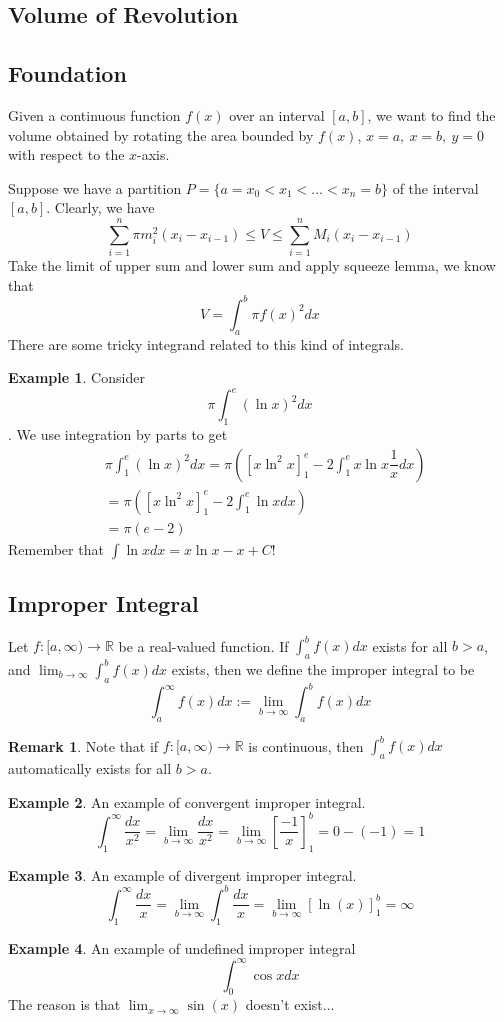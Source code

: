 \documentclass{article}
\theoremstyle{definition}
\theoremstyle{definition}
\theoremstyle{definition}
\theoremstyle{definition}
\theoremstyle{definition}
\newtheorem{remark}{Remark}
\theoremstyle{definition}
\newtheorem{example}{Example}
\theoremstyle{definition}
\theoremstyle{definition}
\theoremstyle{definition}
\newcommand{\RR}{\mathbb{R}}
\begin{document}
\subsection{Volume of Revolution}
\subsection{Foundation}
Given a continuous function $f(x)$ over an interval $[a,b]$,
we want to find the volume obtained by rotating the area bounded by $f(x)$, $x=a,\ x=b,\ y=0$ with respect to the $x$-axis.

Suppose we have a partition $P=\{a=x_0<x_1<\ldots<x_n=b\}$ of the interval $[a,b]$.
Clearly, we have 
\[
\sum_{i=1}^n\pi m_i^2(x_{i}-x_{i-1})\le V\le \sum_{i=1}^n M_i(x_{i}-x_{i-1})   
\]
Take the limit of upper sum and lower sum and apply squeeze lemma, we know that
\[
V=\int_a^b\pi f(x)^2dx    
\]
There are some tricky integrand related to this kind of integrals. 
\begin{example}
    Consider $$\pi\int_1^e(\ln x)^2dx$$. We use integration by parts to get
    \begin{align*}
        &\pi\int_1^e(\ln x)^2dx=\pi([x\ln^2 x]_1^e-2\int_1^e x\ln x\dfrac{1}{x}dx)\\
        &=\pi([x\ln^2 x]_1^e-2\int_1^e \ln xdx)\\
        &=\pi(e-2)
    \end{align*}
    Remember that $\int\ln xdx=x\ln x-x+C$!
\end{example}

\subsection{Improper Integral}
Let $f:[a,\infty)\to\RR$ be a real-valued function. If $\int_a^b f(x)dx$ exists for all $b>a$, and $\lim_{b\to\infty}\int_a^b f(x)dx$ exists,
then we define the improper integral to be
$$\int_a^\infty f(x)dx:=\lim_{b\to\infty}\int_a^b f(x)dx$$
\begin{remark}
    Note that if $f:[a,\infty)\to\RR$ is continuous, then $\int_a^b f(x)dx$ automatically exists for all $b>a$.
\end{remark}
\begin{example}
    An example of convergent improper integral.
    \[
    \int_1^\infty\dfrac{dx}{x^2}=\lim_{b\to\infty}\dfrac{dx}{x^2}=\lim_{b\to\infty}\left[\dfrac{-1}{x}\right]_1^b=0-(-1)=1
    \]
\end{example}
\begin{example}
    An example of divergent improper integral.
    \[
    \int_1^\infty\dfrac{dx}{x}=\lim_{b\to\infty}\int_1^b\dfrac{dx}{x}=\lim_{b\to\infty}[\ln(x)]_1^b=\infty    
    \]
\end{example}
\begin{example}
    An example of undefined improper integral
    \[
    \int_0^\infty\cos xdx    
    \]
    The reason is that $\lim_{x\to\infty}\sin(x)$ doesn't exist...
\end{example}
\end{document}
